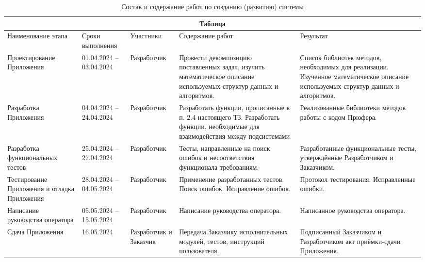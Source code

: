 \documentclass[12pt,a4paper]{article}
\begin{document}
\begin{table}[h!]
    \centering
    \footnotesize
    \caption{Состав и содержание работ по созданию (развитию) системы}
    \begin{tabularx}{\textwidth}{|p{2.5cm}|p{2cm}|p{2cm}|X|X|}
    \hline
    \multicolumn{5}{|c|}{\textbf{Таблица}} \\ 
    \hline

    Наименование этапа & Сроки выполнения & Участники & Содержание работ & Результат\\
    \hline

    Проектирование Приложения &
    01.04.2024 \hspace{2cm} -- \hspace{3cm} 03.04.2024 &
    Разработчик &
    Провести декомпозицию поставленных задач, изучить математическое описание используемых структур данных и
    алгоритмов. &
    Список библиотек методов, необходимых для реализации. Изученное математическое описание используемых
    структур данных и алгоритмов.\\
    \hline

    Разработка Приложения & 
    04.04.2024 \hspace{2cm} -- \hspace{3cm} 24.04.2024 & 
    Разработчик & 
    Разработать функции, прописанные в п. 2.4 настоящего ТЗ. Разработать функции, необходимые для взаимодействия
    между подсистемами &
    Реализованные библиотеки методов работы с кодом Прюфера.\\
    \hline

    Разработка функциональных тестов & 
    25.04.2024 \hspace{2cm} -- \hspace{3cm} 27.04.2024 & 
    Разработчик & 
    Тесты, направленные на поиск ошибок и несоответствия функционала требованиям. &
    Разработанные функциональные тесты, утверждённые Разработчиком и Заказчиком. \\
    \hline

    Тестирование Приложения и отладка Приложения & 
    28.04.2024 \hspace{2cm} -- \hspace{3cm} 04.05.2024 & 
    Разработчик & 
    Применение разработанных тестов. Поиск ошибок. Исправление ошибок. & 
    Протокол тестирования. Исправленные ошибки. \\
    \hline

    Написание руководства оператора & 
    05.05.2024 \hspace{2cm} -- \hspace{3cm} 15.05.2024 & 
    Разработчик & 
    Написание руководства оператора. & 
    Написанное руководства оператора. \\
    \hline

    Сдача Приложения &
    16.05.2024 &
    Разработчик и Заказчик &
    Передача Заказчику исполнительных модулей, тестов, инструкций пользователя. &
    Подписанный Заказчиком и Разработчиком акт приёмки-сдачи Приложения. \\
    \hline
    \end{tabularx}
\end{table}
\newpage
\end{document}
